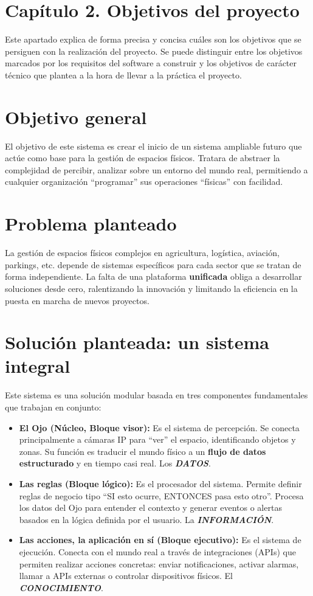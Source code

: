 \documentclass[12pt,a4paper]{article}
\newcommand{\capitulo}[2]{%
	\section*{Capítulo #1. #2}%
}
\begin{document}
	
	\capitulo{2}{Objetivos del proyecto}
	
	Este apartado explica de forma precisa y concisa cuáles son los objetivos que se persiguen con la realización del proyecto. 
	Se puede distinguir entre los objetivos marcados por los requisitos del software a construir y los objetivos de carácter técnico 
	que plantea a la hora de llevar a la práctica el proyecto.
	
	\section{Objetivo general}
	
	El objetivo de este sistema es crear el inicio de un sistema ampliable futuro que actúe como base para la gestión de espacios físicos. Tratara de abstraer la complejidad de percibir, analizar sobre un entorno del mundo real, permitiendo a cualquier organización “programar” sus operaciones “físicas” con facilidad.
	
	\section{Problema planteado}
	
	La gestión de espacios físicos complejos en agricultura, logística, aviación, parkings, etc. depende de sistemas específicos 
	para cada sector que se tratan de forma independiente. La falta de una plataforma \textbf{unificada} obliga a desarrollar soluciones desde cero, ralentizando la innovación y limitando la eficiencia en la puesta en marcha de nuevos proyectos.
	
	\section{Solución planteada: un sistema integral}
	
	Este sistema es una solución modular basada en tres componentes fundamentales que trabajan en conjunto:
	
	\begin{itemize}
		\item \textbf{El Ojo (Núcleo, Bloque visor):} Es el sistema de percepción. 
		Se conecta principalmente a cámaras IP para “ver” el espacio, identificando objetos y zonas. Su función es traducir el mundo físico a un \textbf{flujo de datos estructurado} y en tiempo casi real. 
		Los \textbf{\textit{DATOS}}.
		
		\item \textbf{Las reglas (Bloque lógico):} Es el procesador del sistema. Permite definir reglas de negocio tipo “SI esto ocurre, ENTONCES pasa esto otro”. Procesa los datos del Ojo para entender el contexto y generar eventos o alertas basados en la lógica definida por el usuario. La \textbf{\textit{INFORMACIÓN}}.
		
		\item \textbf{Las acciones, la aplicación en sí (Bloque ejecutivo):} Es el sistema de ejecución. 
		Conecta con el mundo real a través de integraciones (APIs) que permiten realizar acciones concretas: 
		enviar notificaciones, activar alarmas, llamar a APIs externas o controlar dispositivos físicos. 
		El \textbf{\textit{CONOCIMIENTO}}.
	\end{itemize}
	
\end{document}
